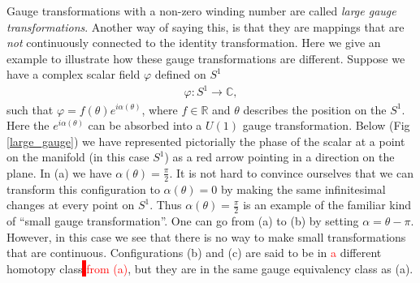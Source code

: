     Gauge transformations with a non-zero winding number are called \textit{large gauge transformations}. Another way of saying this, is that they are mappings that are \textit{not} continuously connected to the identity transformation. Here we give an example to illustrate how these gauge transformations are different.
    Suppose we have a complex scalar field $\varphi$ defined on  $S^1$
    \begin{align}
        \varphi: S^1 \rightarrow \mathbb{C},
    \end{align}
    such that $\varphi = f(\theta) e^{i \alpha(\theta)}$, where $f\in \mathbb{R}$ and $\theta$ describes the position on the $S^1$. Here the $e ^{i \alpha (\theta)}$ can be absorbed into a $U(1)$ gauge transformation. Below (Fig \ref{large_gauge}) we have represented pictorially the phase of the scalar at a point on the manifold (in this case $S^1$) as a red arrow pointing in a direction on the plane. In (a) we have $\alpha(\theta) = \frac{\pi}{2}$. It is not hard to convince ourselves that we can transform this configuration to $\alpha(\theta) =0$ by making the same infinitesimal changes at every point on $S^1$. Thus $\alpha(\theta) = \frac{\pi}{2}$ is an example of the familiar kind of ``small gauge transformation''. One can go from (a) to (b) by setting $\alpha =\theta - \pi$. However, in this case we see that there is no way to make small transformations that are continuous. Configurations (b) and (c) are said to be in \textcolor{red}{a} different homotopy class\colorbox{red}{ } \textcolor{red}{from (a)}, but they are in the same gauge equivalency class as (a).
    



